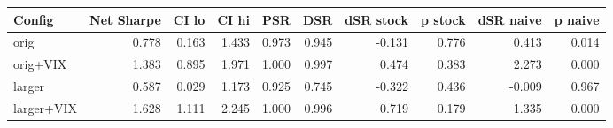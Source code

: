 \begin{tabular}{lrrrrrrrrr}
\toprule
Config & Net Sharpe & CI lo & CI hi & PSR & DSR & dSR stock & p stock & dSR naive & p naive \\
\midrule
orig & 0.778 & 0.163 & 1.433 & 0.973 & 0.945 & -0.131 & 0.776 & 0.413 & 0.014 \\
orig+VIX & 1.383 & 0.895 & 1.971 & 1.000 & 0.997 & 0.474 & 0.383 & 2.273 & 0.000 \\
larger & 0.587 & 0.029 & 1.173 & 0.925 & 0.745 & -0.322 & 0.436 & -0.009 & 0.967 \\
larger+VIX & 1.628 & 1.111 & 2.245 & 1.000 & 0.996 & 0.719 & 0.179 & 1.335 & 0.000 \\
\bottomrule
\end{tabular}
